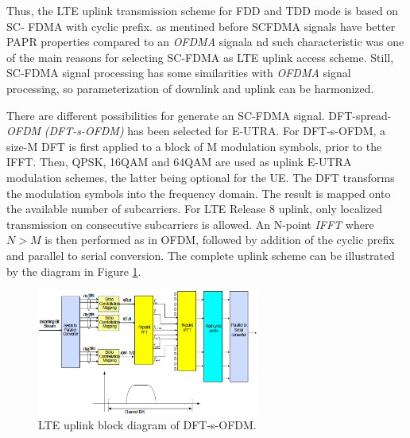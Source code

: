 Thus, the LTE uplink transmission scheme for FDD and TDD mode is based on SC-
FDMA with cyclic prefix. as mentined before  SCFDMA signals have better PAPR
properties compared to an \textit{OFDMA} signala nd such characteristic was one
of the main reasons for selecting SC-FDMA as LTE uplink access scheme. Still,
SC-FDMA signal processing has some similarities with \textit{OFDMA} signal
processing, so parameterization of downlink and uplink can be harmonized.

There are different possibilities for generate an SC-FDMA signal. DFT-spread-
\textit{OFDM} \textit{(DFT-s-OFDM)} has been selected for E-UTRA. For
DFT-s-OFDM, a size-M DFT is first applied to a block of M modulation symbols,
prior to the IFFT. Then, QPSK, 16QAM and 64QAM are used as uplink E-UTRA
modulation schemes, the latter being optional for the UE. The DFT transforms the
modulation symbols into the frequency domain. The result is mapped onto the
available number of subcarriers. For LTE Release 8 uplink, only localized
transmission on consecutive subcarriers is allowed. An N-point \textit{IFFT}
where $N>M$ is then performed as in OFDM, followed by addition of the cyclic
prefix and parallel to serial conversion. The complete uplink scheme can be
illustrated by the diagram in Figure \ref{fig:uplinkbd}.

\begin{figure}[htbp]
    \centering
    \includegraphics[width=0.65\textwidth]{./figures/uplink_scheme}
    \caption{ LTE uplink block diagram of DFT-s-OFDM.
    \label{fig:uplinkbd}}
\end{figure}
